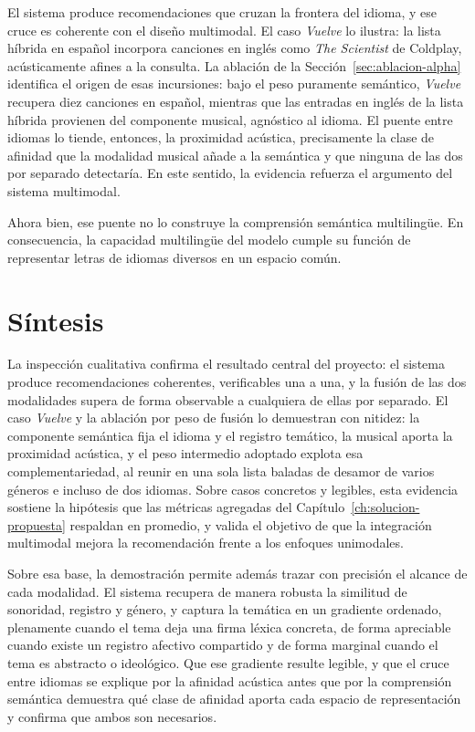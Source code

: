 

El sistema produce recomendaciones que cruzan la frontera del idioma, y ese cruce es coherente con el diseño multimodal. El caso \emph{Vuelve} lo ilustra: la lista híbrida en español incorpora canciones en inglés como \emph{The Scientist} de Coldplay, acústicamente afines a la consulta. La ablación de la Sección~\ref{sec:ablacion-alpha} identifica el origen de esas incursiones: bajo el peso puramente semántico, \emph{Vuelve} recupera diez canciones en español, mientras que las entradas en inglés de la lista híbrida provienen del componente musical, agnóstico al idioma. El puente entre idiomas lo tiende, entonces, la proximidad acústica, precisamente la clase de afinidad que la modalidad musical añade a la semántica y que ninguna de las dos por separado detectaría. En este sentido, la evidencia refuerza el argumento del sistema multimodal.

Ahora bien, ese puente no lo construye la comprensión semántica multilingüe. En consecuencia, la capacidad multilingüe del modelo cumple su función de representar letras de idiomas diversos en un espacio común.

\section{Síntesis}
\label{sec:sintesis-cualitativa}

La inspección cualitativa confirma el resultado central del proyecto: el sistema produce recomendaciones coherentes, verificables una a una, y la fusión de las dos modalidades supera de forma observable a cualquiera de ellas por separado. El caso \emph{Vuelve} y la ablación por peso de fusión lo demuestran con nitidez: la componente semántica fija el idioma y el registro temático, la musical aporta la proximidad acústica, y el peso intermedio adoptado explota esa complementariedad, al reunir en una sola lista baladas de desamor de varios géneros e incluso de dos idiomas. Sobre casos concretos y legibles, esta evidencia sostiene la hipótesis que las métricas agregadas del Capítulo~\ref{ch:solucion-propuesta} respaldan en promedio, y valida el objetivo de que la integración multimodal mejora la recomendación frente a los enfoques unimodales.

Sobre esa base, la demostración permite además trazar con precisión el alcance de cada modalidad. El sistema recupera de manera robusta la similitud de sonoridad, registro y género, y captura la temática en un gradiente ordenado, plenamente cuando el tema deja una firma léxica concreta, de forma apreciable cuando existe un registro afectivo compartido y de forma marginal cuando el tema es abstracto o ideológico. Que ese gradiente resulte legible, y que el cruce entre idiomas se explique por la afinidad acústica antes que por la comprensión semántica demuestra qué clase de afinidad aporta cada espacio de representación y confirma que ambos son necesarios.
